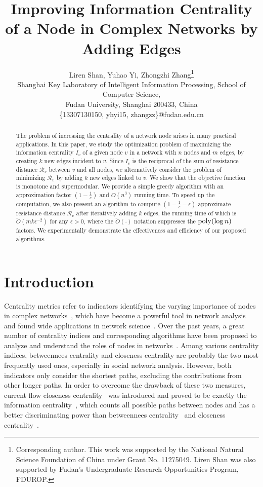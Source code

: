 \documentclass{article}
\title{Improving Information Centrality of a Node in Complex Networks by Adding Edges}%
\author{
Liren Shan,
Yuhao Yi,
Zhongzhi Zhang\thanks{Corresponding author. This work was supported by the National Natural Science Foundation of China under Grant No. 11275049. Liren Shan was also supported by Fudan’s Undergraduate Research Opportunities Program, FDUROP.}
\\
Shanghai Key Laboratory of Intelligent Information Processing, School of Computer Science, \\Fudan University, Shanghai 200433, China\\
%
\{13307130150, yhyi15, zhangzz\}@fudan.edu.cn
}
\def\kh#1{\left( #1 \right)}
\newcommand{\eps}{\epsilon}
\newcommand\Otil{\widetilde{O}}
\begin{document}
\maketitle

\begin{abstract}
The problem of increasing the centrality of a network node arises in many practical applications. In this paper, we study the optimization problem of maximizing the information centrality $I_v$ of a given node $v$ in a network with $n$ nodes and $m$ edges, by creating $k$ new edges incident to $v$. Since $I_v$ is the reciprocal of the sum of resistance distance $\mathcal{R}_v$ between $v$ and all nodes, we alternatively consider the problem of minimizing $\mathcal{R}_v$ by adding $k$ new edges linked to $v$. We show that the objective function is monotone and supermodular. We provide a simple greedy  algorithm with an approximation factor $\kh{1-\frac{1}{e}}$ and $O(n^3)$ running time. To speed up the computation, we also present an algorithm to compute $\left(1-\frac{1}{e}-\eps\right)$-approximate resistance distance $\mathcal{R}_v$ after iteratively adding $k$ edges, the running time of which is $\Otil (mk\eps^{-2})$ for any $\eps>0$, where the $\Otil (\cdot)$ notation suppresses the ${\rm poly} (\log n)$ factors. We experimentally demonstrate the effectiveness and efficiency of our proposed algorithms.
\end{abstract}

\section{Introduction}
Centrality metrics refer to indicators identifying the varying importance of nodes in complex networks~\cite{LuChReZhZhZh16}, which have become a powerful tool in network analysis and found wide applications in network science~\cite{Ne10}. Over the past years, a great number of centrality indices and corresponding algorithms have been proposed to analyze and understand the roles of nodes in networks~\cite{WhSm03,BoVi14}. Among various centrality indices, betweennees centrality and closeness centrality are probably the two most frequently used ones, especially in social network analysis. However, both indicators only consider the shortest paths, excluding the contributions from other longer paths. In order to overcome the drawback of these two measures, current flow closeness centrality~\cite{BrFl05,Ne05} was introduced and  proved to be exactly the information centrality~\cite{StZe89}, which counts all possible paths between nodes and has a better discriminating power than betweennees centrality~\cite{Ne05} and closeness centrality~\cite{BeWeLuMe16}.
\end{document}
